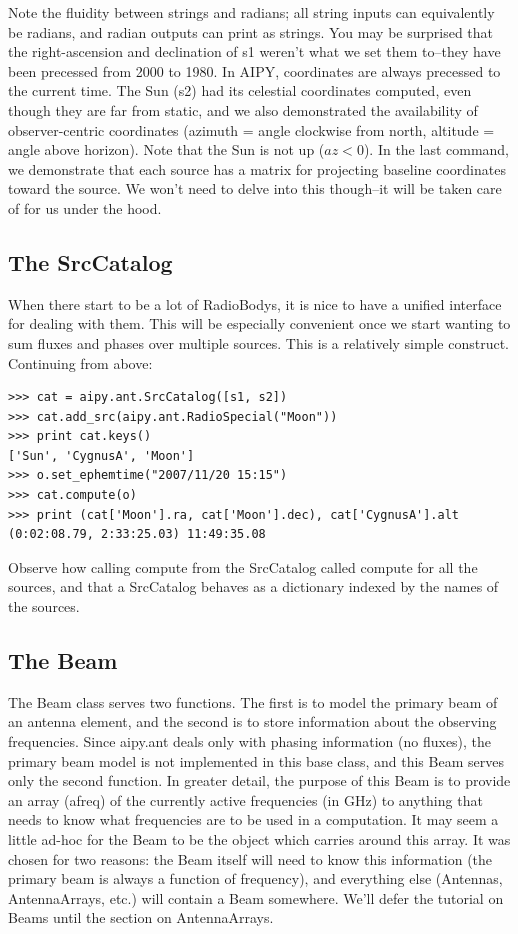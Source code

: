 Note the fluidity between strings and radians; all string inputs can
equivalently be radians, and radian outputs can print as strings.  You may
be surprised that the right-ascension and declination of s1 weren't what
we set them to--they have been precessed from 2000 to 1980.  In AIPY, 
coordinates are always precessed to the current time.  The Sun (s2) had its 
celestial coordinates computed, even though they are far from static, and
we also demonstrated the availability of observer-centric coordinates
(azimuth = angle clockwise from north, altitude = angle above horizon).
Note that the Sun is not up ($az<0$).  In the last command, we demonstrate that
each source has a matrix for projecting baseline coordinates toward
the source.  We won't need to delve into this though--it will be taken care
of for us under the hood.

\subsection{The SrcCatalog}

When there start to be a lot of RadioBodys, it is nice to have a unified
interface for dealing with them.  This will be especially convenient once
we start wanting to sum fluxes and phases over multiple sources.  This
is a relatively simple construct.  Continuing from above:

\begin{verbatim}
>>> cat = aipy.ant.SrcCatalog([s1, s2])
>>> cat.add_src(aipy.ant.RadioSpecial("Moon"))
>>> print cat.keys()
['Sun', 'CygnusA', 'Moon']
>>> o.set_ephemtime("2007/11/20 15:15")
>>> cat.compute(o)
>>> print (cat['Moon'].ra, cat['Moon'].dec), cat['CygnusA'].alt
(0:02:08.79, 2:33:25.03) 11:49:35.08
\end{verbatim}

Observe how calling compute from the SrcCatalog called compute for all
the sources, and that a SrcCatalog behaves as a dictionary indexed by
the names of the sources.

\subsection{The Beam}

The Beam class serves two functions.  The first is to model the primary
beam of an antenna element, and the second is to store information about the
observing frequencies.  Since aipy.ant deals only with phasing information
(no fluxes), the primary beam model is not implemented in this base class,
and this Beam serves only the second function.  In greater detail, the
purpose of this Beam is to provide an array (afreq) of the currently
active frequencies (in GHz) to anything that needs to know what frequencies
are to be used in a computation.  It may seem a little ad-hoc for the Beam to 
be the object which carries around this array.  It was chosen for two
reasons: the Beam itself will need to know this information (the primary
beam is always a function of frequency), and everything else (Antennas,
AntennaArrays, etc.) will contain a Beam somewhere.  We'll defer the
tutorial on Beams until the section on AntennaArrays.

